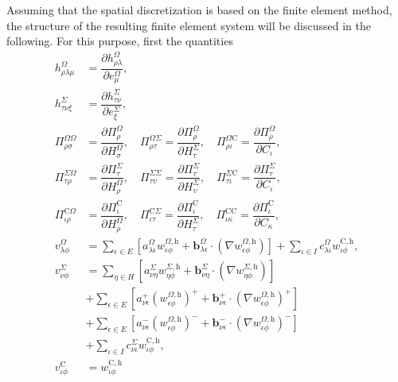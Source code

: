 \documentclass[pdftex,a4paper,12pt,abstracton]{scrartcl}
\begin{document}
Assuming that the spatial discretization is based on the finite element method, the structure of the resulting finite element system will be discussed in the following. For this purpose, first the quantities
\begin{equation}
\begin{split}
h^\Omega_{\rho \lambda \mu} &= \dfrac{\partial h^\Omega_{\rho \lambda}}{\partial e^\Omega_\mu},\\
h^\Sigma_{\tau \nu \xi} &= \dfrac{\partial h^\Sigma_{\tau \nu}}{\partial e^\Sigma_\xi},\\
\Pi^{\Omega\Omega}_{\rho\sigma} &= \dfrac{\partial \Pi^{\Omega}_\rho}{\partial H^\Omega_\sigma},\quad
\Pi^{\Omega\Sigma}_{\rho\tau} = \dfrac{\partial \Pi^{\Omega}_\rho}{\partial H^\Sigma_\tau},\quad
\Pi^{\Omega\mathrm{C}}_{\rho\iota} = \dfrac{\partial \Pi^{\Omega}_\rho}{\partial C_\iota},\\
\Pi^{\Sigma\Omega}_{\tau\rho} &= \dfrac{\partial \Pi^{\Sigma}_\tau}{\partial H^\Omega_\rho},\quad
\Pi^{\Sigma\Sigma}_{\tau\upsilon} = \dfrac{\partial \Pi^{\Sigma}_\tau}{\partial H^\Sigma_\upsilon},\quad
\Pi^{\Sigma\mathrm{C}}_{\tau\iota} = \dfrac{\partial \Pi^{\Sigma}_\tau}{\partial C_\iota},\\
\Pi^{\mathrm{C}\Omega}_{\iota\rho} &= \dfrac{\partial \Pi^\mathrm{C}_\iota}{\partial H^\Omega_\rho},\quad
\Pi^{\mathrm{C}\Sigma}_{\iota\tau} = \dfrac{\partial \Pi^\mathrm{C}_\iota}{\partial H^\Sigma_\tau},\quad
\Pi^{\mathrm{C}\mathrm{C}}_{\iota\kappa} = \dfrac{\partial \Pi^\mathrm{C}_\iota}{\partial C_\kappa},\\
v^\Omega_{\lambda\phi} &= \sum_{\epsilon \in E} \left[ a^\Omega_{\lambda\epsilon} w^{\Omega,\mathrm{h}}_{\epsilon\phi} + \boldsymbol{b}^\Omega_{\lambda \epsilon} \cdot (\nabla w^{\Omega,\mathrm{h}}_{\epsilon\phi}) \right] + \sum_{\iota \in I}c^\Omega_{\lambda\iota} w^\mathrm{C,h}_{\iota\phi} ,\\
v^\Sigma_{\nu\phi} &=  \sum_{\eta \in H} \left[ a^\Sigma_{\nu\eta} w^{\Sigma,\mathrm{h}}_{\eta\phi} + \boldsymbol{b}^\Sigma_{\nu\eta} \cdot (\nabla w^{\Sigma,\mathrm{h}}_{\eta\phi}) \right]\\
                   & + \sum_{\epsilon \in E} \left[ a^+_{\nu\epsilon} (w^{\Omega,\mathrm{h}}_{\epsilon\phi})^+ + \boldsymbol{b}^+_{\nu\epsilon} \cdot (\nabla w^{\Omega,\mathrm{h}}_{\epsilon\phi})^+ \right]\\
                   & + \sum_{\epsilon \in E} \left[ a^-_{\nu\epsilon} (w^{\Omega,\mathrm{h}}_{\epsilon\phi})^- + \boldsymbol{b}^-_{\nu\epsilon} \cdot (\nabla w^{\Omega,\mathrm{h}}_{\epsilon\phi})^- \right]\\
                   & + \sum_{\iota \in I} c^\Sigma_{\nu\iota} w^\mathrm{C,h}_{\iota\phi},\\
v^\mathrm{C}_{\iota\phi} &= w^\mathrm{C,h}_{\iota\phi}
\end{split}
\end{equation}
\end{document}
